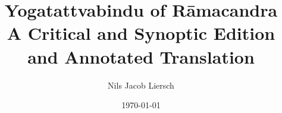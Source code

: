 
%

\author{Nils Jacob Liersch}
\title{Yogatattvabindu of Rāmacandra\\ A Critical and Synoptic Edition and Annotated Translation}
\date{\today}

\parindent=15pt



